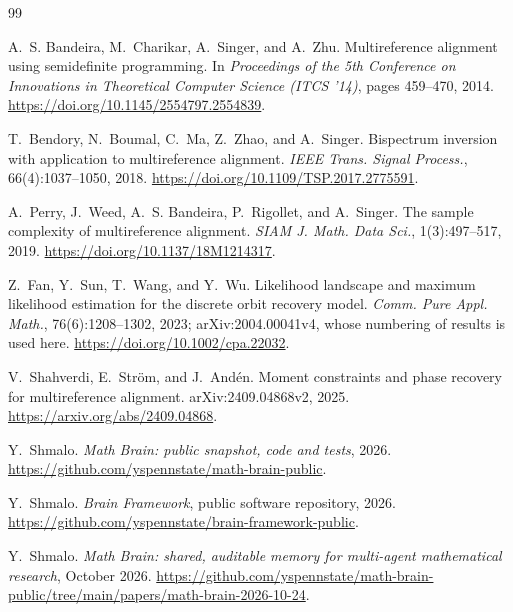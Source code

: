 \documentclass[11pt]{article}
\theoremstyle{remark}
\begin{document}
\begin{thebibliography}{99}

A.~S. Bandeira, M.~Charikar, A.~Singer, and A.~Zhu.
\newblock Multireference alignment using semidefinite programming.
\newblock In \emph{Proceedings of the 5th Conference on Innovations in Theoretical Computer Science (ITCS '14)}, pages 459--470, 2014.
\newblock \url{https://doi.org/10.1145/2554797.2554839}.

T.~Bendory, N.~Boumal, C.~Ma, Z.~Zhao, and A.~Singer.
\newblock Bispectrum inversion with application to multireference alignment.
\newblock \emph{IEEE Trans. Signal Process.}, 66(4):1037--1050, 2018.
\newblock \url{https://doi.org/10.1109/TSP.2017.2775591}.

A.~Perry, J.~Weed, A.~S. Bandeira, P.~Rigollet, and A.~Singer.
\newblock The sample complexity of multireference alignment.
\newblock \emph{SIAM J. Math. Data Sci.}, 1(3):497--517, 2019.
\newblock \url{https://doi.org/10.1137/18M1214317}.

Z.~Fan, Y.~Sun, T.~Wang, and Y.~Wu.
\newblock Likelihood landscape and maximum likelihood estimation for the discrete orbit recovery model.
\newblock \emph{Comm. Pure Appl. Math.}, 76(6):1208--1302, 2023; arXiv:2004.00041v4, whose numbering of results is used here.
\newblock \url{https://doi.org/10.1002/cpa.22032}.

V.~Shahverdi, E.~Str\"om, and J.~And\'en.
\newblock Moment constraints and phase recovery for multireference alignment.
\newblock arXiv:2409.04868v2, 2025.
\newblock \url{https://arxiv.org/abs/2409.04868}.

Y.~Shmalo.
\newblock \emph{Math Brain: public snapshot, code and tests}, 2026.
\newblock \url{https://github.com/yspennstate/math-brain-public}.

Y.~Shmalo.
\newblock \emph{Brain Framework}, public software repository, 2026.
\newblock \url{https://github.com/yspennstate/brain-framework-public}.

Y.~Shmalo.
\newblock \emph{Math Brain: shared, auditable memory for multi-agent mathematical research}, October 2026.
\newblock \url{https://github.com/yspennstate/math-brain-public/tree/main/papers/math-brain-2026-10-24}.

\end{thebibliography}
\end{document}
